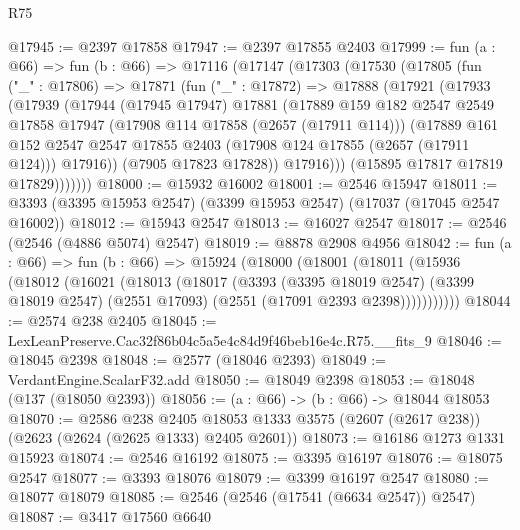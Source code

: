 \begin{lexlean}{R75}
\begin{coremodule}
@17945 := @2397 @17858
@17947 := @2397 @17855 @2403
@17999 := fun (a : @66) =>
  fun (b : @66) =>
  @17116
    (@17147
      (@17303
        (@17530
          (@17805
            (fun ("_" : @17806) =>
            @17871
              (fun ("_" : @17872) =>
              @17888
                (@17921
                  (@17933
                    (@17939
                      (@17944
                        (@17945 @17947)
                        @17881
                        (@17889
                          @159
                          @182
                          @2547
                          @2549
                          @17858
                          @17947
                          (@17908 @114 @17858 (@2657 (@17911 @114)))
                          (@17889
                            @161
                            @152
                            @2547
                            @2547
                            @17855
                            @2403
                            (@17908 @124 @17855 (@2657 (@17911 @124)))
                            @17916))
                        (@7905 @17823 @17828))
                      @17916)))
                (@15895 @17817 @17819 @17829)))))))
@18000 := @15932 @16002
@18001 := @2546 @15947
@18011 := @3393 (@3395 @15953 @2547) (@3399 @15953 @2547) (@17037 (@17045 @2547 @16002))
@18012 := @15943 @2547
@18013 := @16027 @2547
@18017 := @2546 (@2546 (@4886 @5074) @2547)
@18019 := @8878 @2908 @4956
@18042 := fun (a : @66) =>
  fun (b : @66) =>
  @15924
    (@18000
      (@18001
        (@18011
          (@15936
            (@18012
              (@16021
                (@18013
                  (@18017
                    (@3393
                      (@3395 @18019 @2547)
                      (@3399 @18019 @2547)
                      (@2551 @17093)
                      (@2551 (@17091 @2393 @2398)))))))))))
@18044 := @2574 @238 @2405
@18045 := LexLeanPreserve.Cac32f86b04c5a5e4c84d9f46beb16e4c.R75.__fits_9
@18046 := @18045 @2398
@18048 := @2577 (@18046 @2393)
@18049 := VerdantEngine.ScalarF32.add
@18050 := @18049 @2398
@18053 := @18048 (@137 (@18050 @2393))
@18056 := (a : @66) -> (b : @66) -> @18044 @18053
@18070 := @2586
    @238
    @2405
    @18053
    @1333
    @3575
    (@2607 (@2617 @238))
    (@2623 (@2624 (@2625 @1333) @2405 @2601))
@18073 := @16186 @1273 @1331 @15923
@18074 := @2546 @16192
@18075 := @3395 @16197
@18076 := @18075 @2547
@18077 := @3393 @18076
@18079 := @3399 @16197 @2547
@18080 := @18077 @18079
@18085 := @2546 (@2546 (@17541 (@6634 @2547)) @2547)
@18087 := @3417 @17560 @6640

\end{coremodule}
\end{lexlean}

